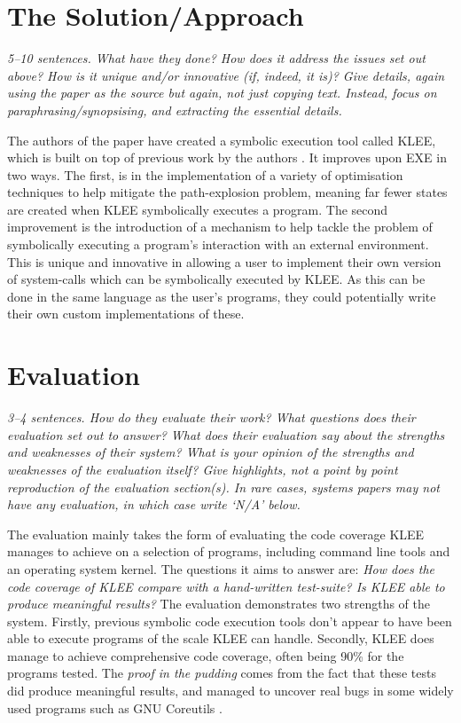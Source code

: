 \documentclass[11pt]{article}
\begin{document}
\section*{The Solution/Approach}

\textsl{5--10 sentences. What have they done? How does it address the issues
set out above? How is it unique and/or innovative (if, indeed, it is)? Give
details, again using the paper as the source but again, not just copying text.
Instead, focus on paraphrasing/synopsising, and extracting the essential
details.}

The authors of the paper have created a symbolic execution tool called KLEE,
which is built on top of previous work by the authors \cite{EXE}. It improves
upon EXE in two ways. The first, is in the implementation of a variety of
optimisation techniques to help mitigate the path-explosion problem, meaning
far fewer states are created when KLEE symbolically executes a program. The
second improvement is the introduction of a mechanism to help tackle the
problem of symbolically executing a program's interaction with an external
environment. This is unique and innovative in allowing a user to implement
their own version of system-calls which can be symbolically executed by KLEE.
As this can be done in the same language as the user's programs, they could
potentially write their own custom implementations of these.

\section*{Evaluation}

\textsl{3--4 sentences. How do they evaluate their work? What questions does
their evaluation set out to answer? What does their evaluation say about the
strengths and weaknesses of their system? What is your opinion of the strengths
and weaknesses of the evaluation itself? Give highlights, not a point by point
reproduction of the evaluation section(s). In rare cases, systems papers may
not have any evaluation, in which case write `N/A' below.}

The evaluation mainly takes the form of evaluating the code coverage KLEE
manages to achieve on a selection of programs, including command line tools and
an operating system kernel. The questions it aims to answer are: \textit{How
does the code coverage of KLEE compare with a hand-written test-suite? Is KLEE
able to produce meaningful results?} The evaluation demonstrates two strengths
of the system. Firstly, previous symbolic code execution tools don't appear to
have been able to execute programs of the scale KLEE can handle. Secondly, KLEE
does manage to achieve comprehensive code coverage, often being 90\% for the
programs tested. The \textit{proof in the pudding} comes from the fact that
these tests did produce meaningful results, and managed to uncover real bugs in
some widely used programs such as GNU Coreutils \cite{Coreutils}.
\end{document}
